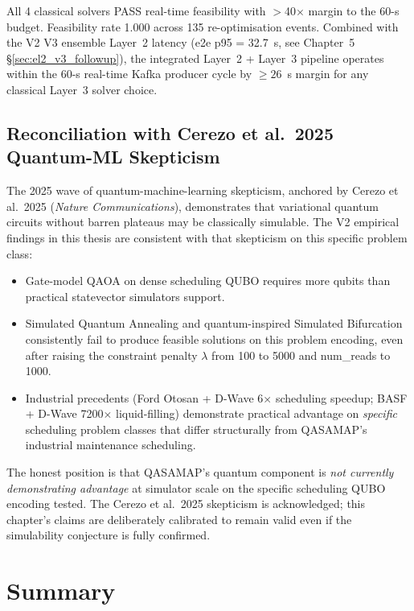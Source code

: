 All 4 classical solvers PASS real-time feasibility with $>$40$\times$ margin to the 60-s budget. Feasibility rate 1.000 across 135 re-optimisation events. Combined with the V2 V3 ensemble Layer~2 latency (e2e p95 = 32.7~s, see Chapter~5 §\ref{sec:el2_v3_followup}), the integrated Layer~2 + Layer~3 pipeline operates within the 60-s real-time Kafka producer cycle by $\geq 26$~s margin for any classical Layer~3 solver choice.

\subsection{Reconciliation with Cerezo et al.\ 2025 Quantum-ML Skepticism}

The 2025 wave of quantum-machine-learning skepticism, anchored by Cerezo et al.\ 2025 (\emph{Nature Communications}), demonstrates that variational quantum circuits without barren plateaus may be classically simulable. The V2 empirical findings in this thesis are consistent with that skepticism on this specific problem class:

\begin{itemize}
    \item Gate-model QAOA on dense scheduling QUBO requires more qubits than practical statevector simulators support.
    \item Simulated Quantum Annealing and quantum-inspired Simulated Bifurcation consistently fail to produce feasible solutions on this problem encoding, even after raising the constraint penalty $\lambda$ from 100 to 5000 and num\_reads to 1000.
    \item Industrial precedents (Ford Otosan + D-Wave 6$\times$ scheduling speedup; BASF + D-Wave 7200$\times$ liquid-filling) demonstrate practical advantage on \emph{specific} scheduling problem classes that differ structurally from QASAMAP's industrial maintenance scheduling.
\end{itemize}

The honest position is that QASAMAP's quantum component is \emph{not currently demonstrating advantage} at simulator scale on the specific scheduling QUBO encoding tested. The Cerezo et al.\ 2025 skepticism is acknowledged; this chapter's claims are deliberately calibrated to remain valid even if the simulability conjecture is fully confirmed.

\section{Summary}

